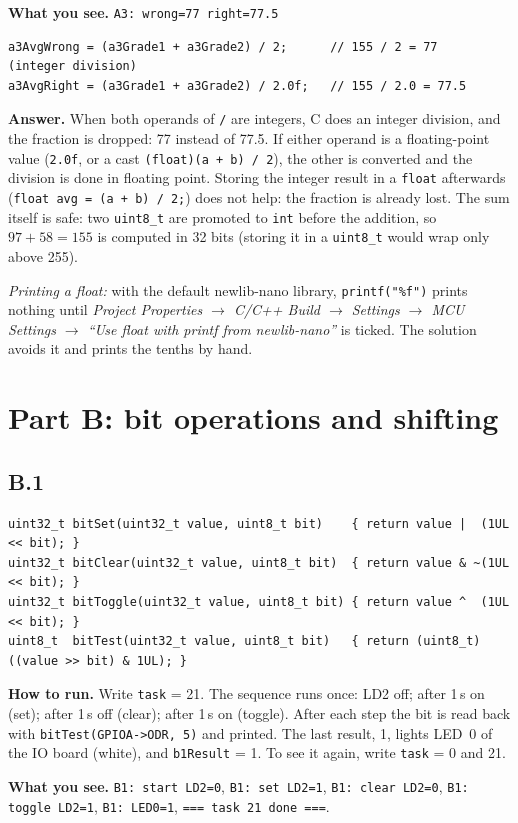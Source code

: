 \documentclass[11pt,a4paper]{article}
\newcommand{\lv}[1]{\texttt{#1}}                 %
\newcommand{\run}[1]{\textbf{How to run.} #1}
\newcommand{\see}[1]{\textbf{What you see.} #1}
\begin{document}
\see{\texttt{A3: wrong=77 right=77.5}}
\begin{lstlisting}
a3AvgWrong = (a3Grade1 + a3Grade2) / 2;      // 155 / 2 = 77   (integer division)
a3AvgRight = (a3Grade1 + a3Grade2) / 2.0f;   // 155 / 2.0 = 77.5
\end{lstlisting}
\textbf{Answer.} When both operands of \texttt{/} are integers, C does an integer division, and the fraction is
dropped: 77 instead of 77.5. If either operand is a floating-point value (\texttt{2.0f}, or a cast
\texttt{(float)(a + b) / 2}), the other is converted and the division is done in floating point. Storing the
integer result in a \texttt{float} afterwards (\texttt{float avg = (a + b) / 2;}) does not help: the fraction is
already lost. The sum itself is safe: two \texttt{uint8\_t} are promoted to \texttt{int} before the addition, so
$97 + 58 = 155$ is computed in 32 bits (storing it in a \texttt{uint8\_t} would wrap only above 255).

\emph{Printing a float:} with the default newlib-nano library, \texttt{printf("\%f")} prints nothing until
\emph{Project Properties $\to$ C/C++ Build $\to$ Settings $\to$ MCU Settings $\to$ ``Use float with printf from
newlib-nano''} is ticked. The solution avoids it and prints the tenths by hand.

\section{Part B: bit operations and shifting}

\subsection*{B.1}
\begin{lstlisting}
uint32_t bitSet(uint32_t value, uint8_t bit)    { return value |  (1UL << bit); }
uint32_t bitClear(uint32_t value, uint8_t bit)  { return value & ~(1UL << bit); }
uint32_t bitToggle(uint32_t value, uint8_t bit) { return value ^  (1UL << bit); }
uint8_t  bitTest(uint32_t value, uint8_t bit)   { return (uint8_t)((value >> bit) & 1UL); }
\end{lstlisting}
\run{Write \lv{task} = 21. The sequence runs once: LD2 off; after 1\,s on (set); after 1\,s off (clear); after 1\,s on
(toggle). After each step the bit is read back with \texttt{bitTest(GPIOA->ODR, 5)} and printed. The last result, 1,
lights LED~0 of the IO board (white), and \lv{b1Result} = 1. To see it again, write \lv{task} = 0 and 21.}

\see{\texttt{B1: start LD2=0}, \texttt{B1: set LD2=1}, \texttt{B1: clear LD2=0}, \texttt{B1: toggle LD2=1},
\texttt{B1: LED0=1}, \texttt{=== task 21 done ===}.}
\end{document}

